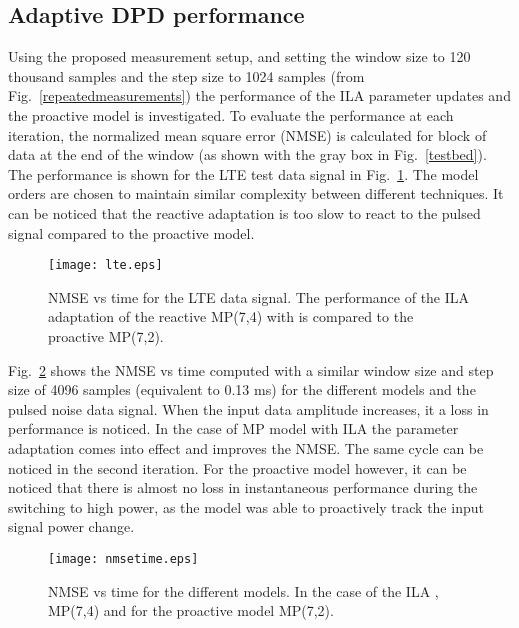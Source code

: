 \documentclass[journal]{IEEEtran}
\begin{document}
\subsection{Adaptive DPD performance}
Using the proposed measurement setup, and setting the window size to 120 thousand samples and the step size to 1024 samples (from Fig.~\ref{repeatedmeasurements}) the performance of the ILA parameter updates and the proactive model is investigated. To evaluate the performance at each iteration, the normalized mean square error (NMSE) is calculated for block of data at the end of the window (as shown with the gray box in Fig.~\ref{testbed}). The performance is shown for the LTE test data signal in Fig.~\ref{lte}. The model orders are chosen to maintain similar complexity between different techniques. It can be noticed that the reactive adaptation is too slow to react to the pulsed signal compared to the proactive model.
\begin{figure}
\centering
\texttt{[image: lte.eps]}
\caption{NMSE vs time for the LTE data signal. The performance of the ILA adaptation of the reactive MP(7,4) with  is compared to the proactive MP(7,2).} \label{lte}
\end{figure}

Fig.~\ref{nmsetime} shows the NMSE  vs time computed with a similar window size and step size of 4096 samples (equivalent to 0.13 ms) for the different models and the pulsed noise data signal. When the input data amplitude increases, it a loss in performance is noticed. In the case of MP model with ILA the parameter adaptation comes into effect and improves the NMSE. The same cycle can be noticed in the second iteration. For the proactive model however, it can be noticed that there is almost no loss in instantaneous performance during the switching to high power, as the model was able to proactively track the input signal power change.

\begin{figure}
\centering
\texttt{[image: nmsetime.eps]}
\caption{NMSE vs time for the different models. In the case of the ILA , MP(7,4) and for the proactive model MP(7,2).} \label{nmsetime}
\end{figure}
\end{document}
